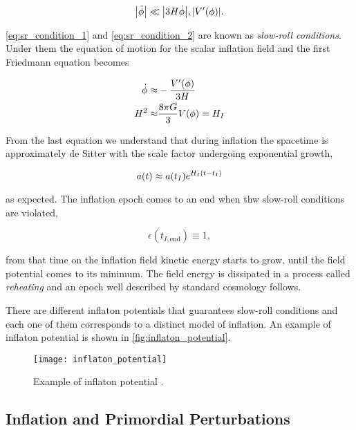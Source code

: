 \begin{equation}
        \abs{\ddot\phi} \ll \abs{3H\dot\phi}, \abs{V'\qty(\phi)}.
        \label{eq:sr_condition_2}
\end{equation}

\autoref{eq:sr_condition_1} and \autoref{eq:sr_condition_2} are known as
\emph{slow-roll conditions}. Under them the equation of motion for the
scalar inflation field and the first Friedmann equation becomes

\begin{align}
        \dot\phi \approx & -\frac{V'\qty(\phi)}{3H}  \\
        H^2 \approx & \frac{8\pi G}{3} V\qty(\phi) = H_I
\end{align}

From the last equation we understand that during inflation the spacetime is
approximately de Sitter with the scale factor undergoing exponential growth,

\begin{equation}
        a\qty(t) \approx a\qty(t_I)e^{H_I\qty(t - t_I)}
\end{equation}

as expected. The inflation epoch comes to an end when thw slow-roll
conditions are violated,

\begin{equation}
        \epsilon(t_{I,\text{end}}) \equiv 1,
\end{equation}

from that time on the inflation field kinetic energy starts to grow,
until the field potential comes to its minimum. The field energy is
dissipated in a process called \emph{reheating} and an epoch well
described by standard cosmology follows.

There are different inflaton potentials that guarantees slow-roll
conditions and each one of them corresponds to a distinct model of
inflation. An example of inflaton potential is shown in
\autoref{fig:inflaton_potential}.

\begin{figure}
        \centering
        \texttt{[image: inflaton\_potential]}
        \caption{Example of inflaton potential \autocite{baumann2009tasi}.}
        \label{fig:inflaton_potential}
\end{figure}

\subsection{Inflation and Primordial Perturbations}\label{ss:inflation_perturbations}

